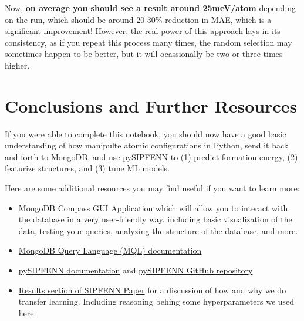 Now, \textbf{on average you should see a result around 25meV/atom}
depending on the run, which should be around 20-30\% reduction in MAE,
which is a significant improvement! However, the real power of this
approach lays in its consistency, as if you repeat this process many
times, the random selection may sometimes happen to be better, but it
will ocassionally be two or three times higher.

\hypertarget{conclusions-and-further-resources}{%
\section{Conclusions and Further
Resources}\label{pysipfenntutorial2:conclusions-and-further-resources}}

If you were able to complete this notebook, you should now have a good
basic understanding of how manipulte atomic configurations in Python,
send it back and forth to MongoDB, and use pySIPFENN to (1) predict
formation energy, (2) featurize structures, and (3) tune ML models.

Here are some additional resources you may find useful if you want to
learn more:

\begin{itemize}
\item
  \href{https://www.mongodb.com/try/download/compass}{MongoDB Compass
  GUI Application} which will allow you to interact with the database in
  a very user-friendly way, including basic visualization of the data,
  testing your queries, analyzing the structure of the database, and
  more.
\item
  \href{https://docs.mongodb.com/manual/tutorial/query-documents/}{MongoDB
  Query Language (MQL) documentation}
\item
  \href{https://pysipfenn.org}{pySIPFENN documentation} and
  \href{https://git.pysipfenn.org}{pySIPFENN GitHub repository}
\item
  \href{https://www.sciencedirect.com/science/article/pii/S0927025622000593?via\%3Dihub\#sec3}{Results
  section of SIPFENN Paper} for a discussion of how and why we do
  transfer learning. Including reasoning behing some hyperparameters we
  used here.
\end{itemize}

